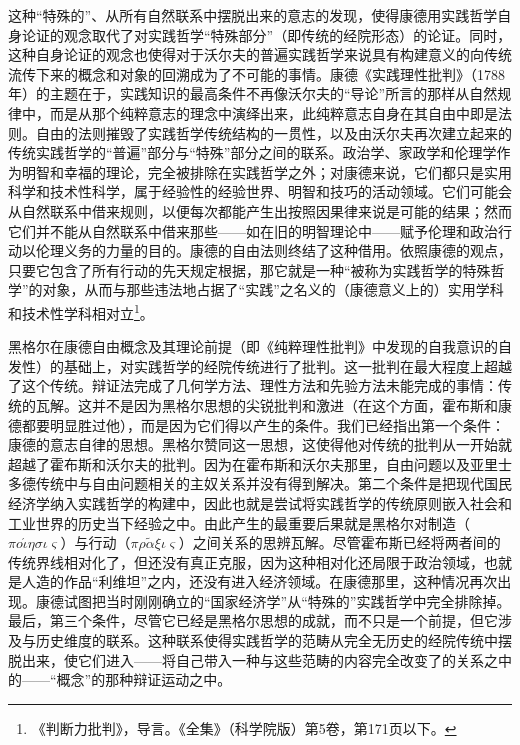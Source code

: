 这种“特殊的”、从所有自然联系中摆脱出来的意志的发现，使得康德用实践哲学自身论证的观念取代了对实践哲学“特殊部分”（即传统的经院形态）的论证。同时，这种自身论证的观念也使得对于沃尔夫的普遍实践哲学来说具有构建意义的向传统流传下来的概念和对象的回溯成为了不可能的事情。康德《实践理性批判》（1788年）的主题在于，实践知识的最高条件不再像沃尔夫的“导论”所言的那样从自然规律中，而是从那个纯粹意志的理念中演绎出来，此纯粹意志自身在其自由中即是法则。自由的法则摧毁了实践哲学传统结构的一贯性，以及由沃尔夫再次建立起来的传统实践哲学的“普遍”部分与“特殊”部分之间的联系。政治学、家政学和伦理学作为明智和幸福的理论，完全被排除在实践哲学之外；对康德来说，它们都只是实用科学和技术性科学，属于经验性的经验世界、明智和技巧的活动领域。它们可能会从自然联系中借来规则，以便每次都能产生出按照因果律来说是可能的结果；然而它们并不能从自然联系中借来那些——如在旧的明智理论中——赋予伦理和政治行动以伦理义务的力量的目的。康德的自由法则终结了这种借用。依照康德的观点，只要它包含了所有行动的先天规定根据，那它就是一种“被称为实践哲学的特殊哲学”的对象，从而与那些违法地占据了“实践”之名义的（康德意义上的）实用学科和技术性学科相对立\footnote{《判断力批判》，导言。《全集》（科学院版）第5卷，第171页以下。}。

黑格尔在康德自由概念及其理论前提（即《纯粹理性批判》中发现的自我意识的自发性）的基础上，对实践哲学的经院传统进行了批判。这一批判在最大程度上超越了这个传统。辩证法完成了几何学方法、理性方法和先验方法未能完成的事情：传统的瓦解。这并不是因为黑格尔思想的尖锐批判和激进（在这个方面，霍布斯和康德都要明显胜过他），而是因为它们得以产生的条件。我们已经指出第一个条件：康德的意志自律的思想。黑格尔赞同这一思想，这使得他对传统的批判从一开始就超越了霍布斯和沃尔夫的批判。因为在霍布斯和沃尔夫那里，自由问题以及亚里士多德传统中与自由问题相关的主奴关系并没有得到解决。第二个条件是把现代国民经济学纳入实践哲学的构建中，因此也就是尝试将实践哲学的传统原则嵌入社会和工业世界的历史当下经验之中。由此产生的最重要后果就是黑格尔对制造（$\pi o\acute{\iota}\eta\sigma\iota\varsigma$）与行动（$\pi\rho\tilde{\alpha}\xi\iota\varsigma$）之间关系的思辨瓦解。尽管霍布斯已经将两者间的传统界线相对化了，但还没有真正克服，因为这种相对化还局限于政治领域，也就是人造的作品“利维坦”之内，还没有进入经济领域。在康德那里，这种情况再次出现。康德试图把当时刚刚确立的“国家经济学”从“特殊的”实践哲学中完全排除掉。最后，第三个条件，尽管它已经是黑格尔思想的成就，而不只是一个前提，但它涉及与历史维度的联系。这种联系使得实践哲学的范畴从完全无历史的经院传统中摆脱出来，使它们进入——将自己带入一种与这些范畴的内容完全改变了的关系之中的——“概念”的那种辩证运动之中。

